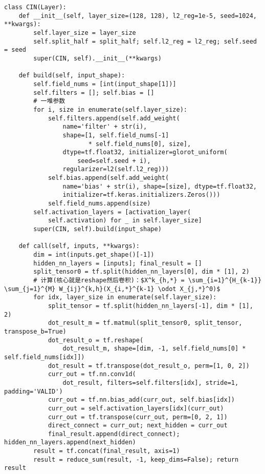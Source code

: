 \documentclass[degree=master,cjk-font=noto]{thuthesis}
\begin{document}
  \begin{verbatim}
class CIN(Layer):
    def __init__(self, layer_size=(128, 128), l2_reg=1e-5, seed=1024, **kwargs):
        self.layer_size = layer_size
        self.split_half = split_half; self.l2_reg = l2_reg; self.seed = seed
        super(CIN, self).__init__(**kwargs)

    def build(self, input_shape):
        self.field_nums = [int(input_shape[1])]
        self.filters = []; self.bias = []
        # 一堆参数
        for i, size in enumerate(self.layer_size):
            self.filters.append(self.add_weight(
                name='filter' + str(i),
                shape=[1, self.field_nums[-1]
                       * self.field_nums[0], size],
                dtype=tf.float32, initializer=glorot_uniform(
                    seed=self.seed + i),
                regularizer=l2(self.l2_reg)))
            self.bias.append(self.add_weight(
                name='bias' + str(i), shape=[size], dtype=tf.float32,
                initializer=tf.keras.initializers.Zeros()))
            self.field_nums.append(size)
        self.activation_layers = [activation_layer(
            self.activation) for _ in self.layer_size]
        super(CIN, self).build(input_shape)

    def call(self, inputs, **kwargs):
        dim = int(inputs.get_shape()[-1])
        hidden_nn_layers = [inputs]; final_result = []
        split_tensor0 = tf.split(hidden_nn_layers[0], dim * [1], 2)
        # 计算(核心就是reshape然后卷积)：$X^k_{h,*} = \sum_{i=1}^{H_{k-1}} \sum_{j=1}^{M} W_{ij}^{k,h}(X_{i,*}^{k-1} \odot X_{j,*}^0)$
        for idx, layer_size in enumerate(self.layer_size):
            split_tensor = tf.split(hidden_nn_layers[-1], dim * [1], 2)
            dot_result_m = tf.matmul(split_tensor0, split_tensor, transpose_b=True)
            dot_result_o = tf.reshape(
                dot_result_m, shape=[dim, -1, self.field_nums[0] * self.field_nums[idx]])
            dot_result = tf.transpose(dot_result_o, perm=[1, 0, 2])
            curr_out = tf.nn.conv1d(
                dot_result, filters=self.filters[idx], stride=1, padding='VALID')
            curr_out = tf.nn.bias_add(curr_out, self.bias[idx])
            curr_out = self.activation_layers[idx](curr_out)
            curr_out = tf.transpose(curr_out, perm=[0, 2, 1])
            direct_connect = curr_out; next_hidden = curr_out
            final_result.append(direct_connect); hidden_nn_layers.append(next_hidden)
        result = tf.concat(final_result, axis=1)
        result = reduce_sum(result, -1, keep_dims=False); return result
  \end{verbatim}
\end{document}
